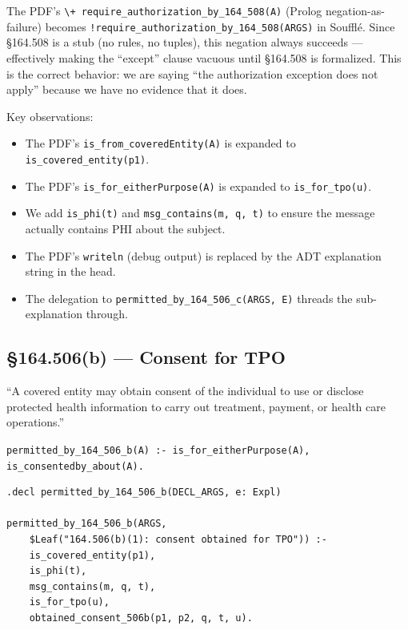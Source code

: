 \documentclass[11pt,letterpaper]{article}
\begin{document}
\begin{designbox}
The PDF's \texttt{\textbackslash+ require\_authorization\_by\_164\_508(A)} (Prolog negation-as-failure) becomes \texttt{!require\_authorization\_by\_164\_508(ARGS)} in Souffl\'{e}. Since \S 164.508 is a stub (no rules, no tuples), this negation always succeeds --- effectively making the ``except'' clause vacuous until \S 164.508 is formalized. This is the correct behavior: we are saying ``the authorization exception does not apply'' because we have no evidence that it does.
\end{designbox}

Key observations:
\begin{itemize}
  \item The PDF's \texttt{is\_from\_coveredEntity(A)} is expanded to \texttt{is\_covered\_entity(p1)}.
  \item The PDF's \texttt{is\_for\_eitherPurpose(A)} is expanded to \texttt{is\_for\_tpo(u)}.
  \item We add \texttt{is\_phi(t)} and \texttt{msg\_contains(m, q, t)} to ensure the message actually contains PHI about the subject.
  \item The PDF's \texttt{writeln} (debug output) is replaced by the ADT explanation string in the head.
  \item The delegation to \texttt{permitted\_by\_164\_506\_c(ARGS, E)} threads the sub-explanation through.
\end{itemize}

\subsection{\S 164.506(b) --- Consent for TPO}
\label{sec:506b}

\begin{hipaabox}
``A covered entity may obtain consent of the individual to use or disclose protected health information to carry out treatment, payment, or health care operations.''
\end{hipaabox}

\begin{pdfbox}
\texttt{permitted\_by\_164\_506\_b(A) :- is\_for\_eitherPurpose(A), is\_consentedby\_about(A).}
\end{pdfbox}

\begin{lstlisting}[style=soufflestyle,caption={\S 164.506(b) --- Consent for TPO}]
.decl permitted_by_164_506_b(DECL_ARGS, e: Expl)

permitted_by_164_506_b(ARGS,
    $Leaf("164.506(b)(1): consent obtained for TPO")) :-
    is_covered_entity(p1),
    is_phi(t),
    msg_contains(m, q, t),
    is_for_tpo(u),
    obtained_consent_506b(p1, p2, q, t, u).
\end{lstlisting}
\end{document}
